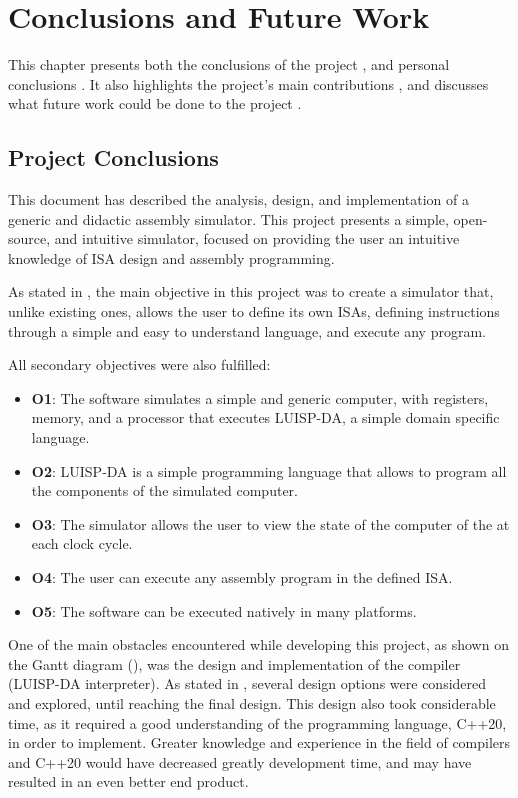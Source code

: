 \chapter{Conclusions and Future Work}\label{chap:conclusions}
This chapter presents both the conclusions of the project , and personal conclusions . It also highlights the project's main contributions , and discusses what future work could be done to the project .


\section{Project Conclusions}\label{sec:project-conclusions}
This document has described the analysis, design, and implementation of a generic and didactic \gls{assembly} simulator. This project presents a simple, open-source, and intuitive simulator, focused on providing the user an intuitive knowledge of \gls{ISA} design and \gls{assembly} programming.

As stated in , the main objective in this project was to create a simulator that, unlike existing ones, allows the user to define its own \glspl{ISA}, defining instructions through a simple and easy to understand language, and execute any  program.

\noindent
All secondary objectives were also fulfilled:
\begin{itemize}
  \item \textbf{O1}: The software simulates a simple and generic computer, with \glspl{register}, \gls{memory}, and a processor that executes LUISP-DA, a simple domain specific language.
  \item \textbf{O2}: LUISP-DA is a simple \gls{programming language} that allows to program all the components of the simulated computer.
  \item \textbf{O3}: The simulator allows the user to view the state of the computer of the at each \gls{clock cycle}.
  \item \textbf{O4}: The user can execute any \gls{assembly} program in the defined \gls{ISA}.
  \item \textbf{O5}: The software can be executed natively in many platforms.
\end{itemize}

One of the main obstacles encountered while developing this project, as shown on the Gantt diagram (), was the design and implementation of the compiler (LUISP-DA interpreter). As stated in , several design options were considered and explored, until reaching the final design. This design also took considerable time, as it required a good understanding of the programming language, C++20, in order to implement. Greater knowledge and experience in the field of compilers and C++20 would have decreased greatly development time, and may have resulted in an even better end product.



